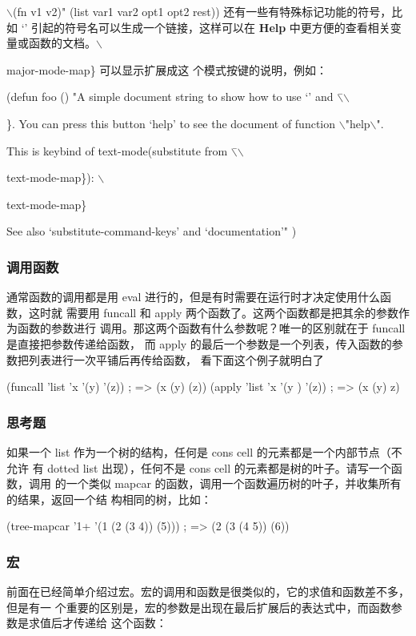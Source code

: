 \documentclass[11pt]{ctexart}
\begin{document}
$\backslash$(fn v1 v2)"
(list var1 var2 opt1 opt2 rest))
还有一些有特殊标记功能的符号，比如 `' 引起的符号名可以生成一个链接，这样可以在
\textbf{Help} 中更方便的查看相关变量或函数的文档。$\backslash$\\{major-mode-map\} 可以显示扩展成这
个模式按键的说明，例如：

(defun foo ()
"A simple document string to show how to use `' and $\backslash$\=$\backslash$\\{\}.
You can press this button `help' to see the document of
function $\backslash$"help$\backslash$".

This is keybind of text-mode(substitute from $\backslash$\=$\backslash$\\{text-mode-map\}):
$\backslash$\\{text-mode-map\}

See also `substitute-command-keys' and `documentation'"
)

\subsubsection{调用函数}
\label{sec:orgc82bb1b}

通常函数的调用都是用 eval 进行的，但是有时需要在运行时才决定使用什么函数，这时就
需要用 funcall 和 apply 两个函数了。这两个函数都是把其余的参数作为函数的参数进行
调用。那这两个函数有什么参数呢？唯一的区别就在于 funcall 是直接把参数传递给函数，
而 apply 的最后一个参数是一个列表，传入函数的参数把列表进行一次平铺后再传给函数，
看下面这个例子就明白了

(funcall 'list 'x '(y) '(z))               ; => (x (y) (z))
(apply 'list 'x '(y ) '(z))                ; => (x (y) z)
\subsubsection{思考题}
\label{sec:org64d55c0}
如果一个 list 作为一个树的结构，任何是 cons cell 的元素都是一个内部节点（不允许
有 dotted list 出现），任何不是 cons cell 的元素都是树的叶子。请写一个函数，调用
的一个类似 mapcar 的函数，调用一个函数遍历树的叶子，并收集所有的结果，返回一个结
构相同的树，比如：

(tree-mapcar '1+ '(1 (2 (3 4)) (5)))    ; => (2 (3 (4 5)) (6))

\subsubsection{宏}
\label{sec:org722f383}

前面在已经简单介绍过宏。宏的调用和函数是很类似的，它的求值和函数差不多，但是有一
个重要的区别是，宏的参数是出现在最后扩展后的表达式中，而函数参数是求值后才传递给
这个函数：

}}}}
\end{document}
